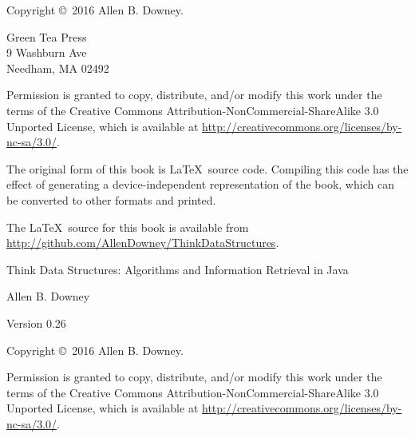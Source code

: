 \documentclass[12pt]{book}
\newcommand{\thetitle}{Think Data Structures}
\newcommand{\thesubtitle}{Algorithms and Information Retrieval in Java}
\newcommand{\theauthors}{Allen B. Downey}
\newcommand{\theversion}{0.26}
\theoremstyle{exercise}
\begin{document}
\begin{latexonly}
\newpage
\thispagestyle{empty}

Copyright \copyright ~2016 \theauthors.

\vspace{0.2in}

\begin{flushleft}
Green Tea Press \\
9 Washburn Ave \\
Needham, MA 02492
\end{flushleft}

Permission is granted to copy, distribute, and/or modify this work under the terms of the Creative Commons Attribution-NonCommercial-ShareAlike 3.0 Unported License, which is available at \url{http://creativecommons.org/licenses/by-nc-sa/3.0/}.

The original form of this book is \LaTeX\ source code.
Compiling this code has the effect of generating a device-independent representation of the book, which can be converted to other formats and printed.

The \LaTeX\ source for this book is available from
\url{http://github.com/AllenDowney/ThinkDataStructures}.


\cleardoublepage
\setcounter{tocdepth}{1}
\tableofcontents

\end{latexonly}


\begin{htmlonly}

\vspace{1em}

{\Large \thetitle: \thesubtitle}

{\large \theauthors}

Version \theversion

\vspace{1em}

Copyright \copyright ~2016 \theauthors.

Permission is granted to copy, distribute, and/or modify this work under the terms of the Creative Commons Attribution-NonCommercial-ShareAlike 3.0 Unported License, which is available at \url{http://creativecommons.org/licenses/by-nc-sa/3.0/}.

\vspace{1em}

\end{htmlonly}
\end{document}
